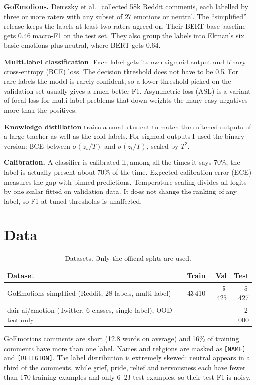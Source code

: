\documentclass[11pt,a4paper]{article}
\begin{document}
\textbf{GoEmotions.} Demszky et al.\ \cite{goemotions} collected 58k Reddit comments, each labelled by three
or more raters with any subset of 27 emotions or neutral. The ``simplified'' release keeps the labels at least
two raters agreed on. Their BERT-base baseline gets 0.46 macro-F1 on the test set. They also group the labels
into Ekman's six basic emotions \cite{ekman} plus neutral, where BERT gets 0.64.

\textbf{Multi-label classification.} Each label gets its own sigmoid output and binary cross-entropy (BCE)
loss. The decision threshold does not have to be 0.5. For rare labels the model is rarely confident, so a
lower threshold picked on the validation set usually gives a much better F1. Asymmetric loss (ASL)
\cite{asl} is a variant of focal loss for multi-label problems that down-weights the many easy negatives more
than the positives.

\textbf{Knowledge distillation} \cite{hinton} trains a small student to match the softened outputs of a large
teacher as well as the gold labels. For sigmoid outputs I used the binary version: BCE between
$\sigma(z_s/T)$ and $\sigma(z_t/T)$, scaled by $T^2$.

\textbf{Calibration.} A classifier is calibrated if, among all the times it says 70\%, the label is actually
present about 70\% of the time. Expected calibration error (ECE) measures the gap with binned predictions.
Temperature scaling \cite{guo} divides all logits by one scalar fitted on validation data. It does not change
the ranking of any label, so F1 at tuned thresholds is unaffected.

\section{Data}

\begin{table}[H]
\centering\small
\begin{tabular}{lrrr}
\toprule
Dataset & Train & Val & Test \\
\midrule
GoEmotions simplified (Reddit, 28 labels, multi-label) & 43\,410 & 5\,426 & 5\,427 \\
dair-ai/emotion (Twitter, 6 classes, single label), OOD test only & -- & -- & 2\,000 \\
\bottomrule
\end{tabular}
\caption{Datasets. Only the official splits are used.}
\end{table}

GoEmotions comments are short (12.8 words on average) and 16\% of training comments have more than one label.
Names and religions are masked as \texttt{[NAME]} and \texttt{[RELIGION]}. The label distribution is extremely
skewed: neutral appears in a third of the comments, while grief, pride, relief and nervousness each have fewer
than 170 training examples and only 6--23 test examples, so their test F1 is noisy.
\end{document}
